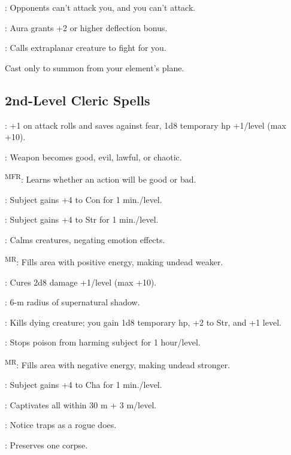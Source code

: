 : Opponents can't attack you, and you can't attack.

: Aura grants +2 or higher deflection bonus.

\footnotemark[1]: Calls extraplanar creature to fight for you.

 Cast only to summon from your element's plane.



\subsection{2nd-Level Cleric Spells}

: +1 on attack rolls and saves against fear, 1d8 temporary hp +1/level (max +10).

: Weapon becomes good, evil, lawful, or chaotic.

\textsuperscript{MFR}: Learns whether an action will be good or bad.

: Subject gains +4 to Con for 1 min./level.

: Subject gains +4 to Str for 1 min./level.

: Calms creatures, negating emotion effects.

\textsuperscript{MR}: Fills area with positive energy, making undead weaker.

: Cures 2d8 damage +1/level (max +10).

: 6-m radius of supernatural shadow.

: Kills dying creature; you gain 1d8 temporary hp, +2 to Str, and +1 level.

: Stops poison from harming subject for 1 hour/level.

\textsuperscript{MR}: Fills area with negative energy, making undead stronger.

: Subject gains +4 to Cha for 1 min./level.

: Captivates all within 30 m + 3 m/level.

: Notice traps as a rogue does.

: Preserves one corpse.

